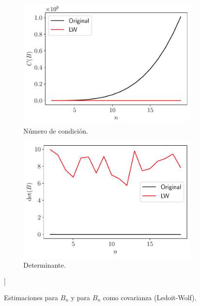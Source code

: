 \documentclass[fleqn]{article}
\begin{document}
\begin{figure}[H]
    \centering
    \begin{subfigure}[b]{0.45\textwidth}
        \centering
        \includegraphics[width=\textwidth]{src/figs/Punto4_cond.pdf}
        \caption{Número de condición.}
        \label{fig:cond}
    \end{subfigure}
    \begin{subfigure}[b]{0.45\textwidth}  
        \centering 
        \includegraphics[width=\textwidth]{src/figs/Punto4_det.pdf}
        \caption{Determinante.}
        \label{fig:det}
    \end{subfigure}]
    \caption{Estimaciones para $B_n$ y para $B_n$ como covarianza (Ledoit-Wolf).}
    \label{fig:B}
\end{figure}
\end{document}
